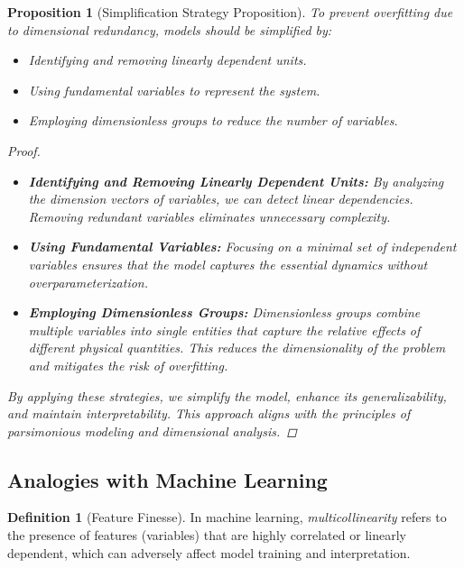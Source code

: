 \documentclass{article}
\newtheorem{proposition}{Proposition}[section]
\theoremstyle{definition}
\newtheorem{definition}{Definition}[section]
\theoremstyle{remark}
\begin{document}
	\begin{proposition}[Simplification Strategy Proposition]
		To prevent overfitting due to dimensional redundancy, models should be simplified by:
		\begin{itemize}
			\item Identifying and removing linearly dependent units.
			\item Using fundamental variables to represent the system.
			\item Employing dimensionless groups to reduce the number of variables.
		\end{itemize}
		
		\begin{proof}
			\begin{itemize}
				\item \textbf{Identifying and Removing Linearly Dependent Units:} By analyzing the dimension vectors of variables, we can detect linear dependencies. Removing redundant variables eliminates unnecessary complexity.
				
				\item \textbf{Using Fundamental Variables:} Focusing on a minimal set of independent variables ensures that the model captures the essential dynamics without overparameterization.
				
				\item \textbf{Employing Dimensionless Groups:} Dimensionless groups combine multiple variables into single entities that capture the relative effects of different physical quantities. This reduces the dimensionality of the problem and mitigates the risk of overfitting.
			\end{itemize}
			
			By applying these strategies, we simplify the model, enhance its generalizability, and maintain interpretability. This approach aligns with the principles of parsimonious modeling and dimensional analysis.
		\end{proof}
	\end{proposition}
	
	\subsection{Analogies with Machine Learning}
	
	\begin{definition}[Feature Finesse]
		In machine learning, \emph{multicollinearity} refers to the presence of features (variables) that are highly correlated or linearly dependent, which can adversely affect model training and interpretation.
	\end{definition}
	
\end{document}
